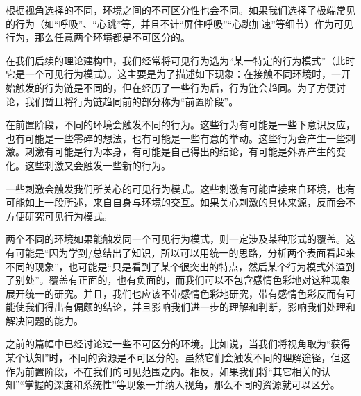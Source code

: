 \begin{explain}
根据视角选择的不同，环境之间的不可区分性也会不同。如果我们选择了极端常见的行为（如“呼吸”、“心跳”等，并且不计“屏住呼吸”“心跳加速”等细节）作为可见行为，那么任意两个环境都是不可区分的。

在我们后续的理论建构中，我们经常将可见行为选为“某一特定的行为模式”（此时它是一个可见行为模式）。这主要是为了描述如下现象：在接触不同环境时，一开始触发的行为链是不同的，但在经历了一些行为后，行为链会趋同。为了方便讨论，我们暂且将行为链趋同前的部分称为“前置阶段”。

在前置阶段，不同的环境会触发不同的行为。这些行为有可能是一些下意识反应，也有可能是一些零碎的想法，也有可能是一些有意的举动。这些行为会产生一些刺激。刺激有可能是行为本身，有可能是自己得出的结论，有可能是外界产生的变化。这些刺激又会触发一些新的行为。

一些刺激会触发我们所关心的可见行为模式。这些刺激有可能直接来自环境，也有可能如上一段所述，来自自身与环境的交互。如果关心刺激的具体来源，反而会不方便研究可见行为模式。

两个不同的环境如果能触发同一个可见行为模式，则一定涉及某种形式的覆盖。这有可能是“因为学到/总结出了知识，所以可以用统一的思路，分析两个表面看起来不同的现象”，也可能是“只是看到了某个很突出的特点，然后某个行为模式外溢到了别处”。覆盖有正面的，也有负面的，而我们可以不包含感情色彩地对这种现象展开统一的研究。并且，我们也应该不带感情色彩地研究，带有感情色彩反而有可能使我们得出有偏颇的结论，并且影响我们进一步的理解和判断，影响我们处理和解决问题的能力。

之前的篇幅中已经讨论过一些不可区分的环境。比如说，当我们将视角取为“获得某个认知”时，不同的资源是不可区分的。虽然它们会触发不同的理解途径，但这作为前置阶段，不在我们的可见范围之内。相反，如果我们将“其它相关的认知”“掌握的深度和系统性”等现象一并纳入视角，那么不同的资源就可以区分。
\end{explain}

